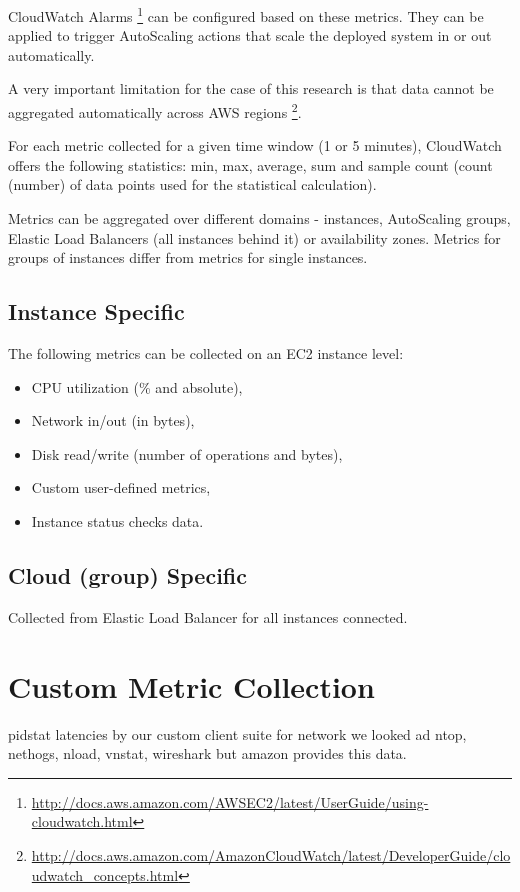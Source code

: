 \documentclass{uvamscse}
\begin{document}
CloudWatch Alarms \footnote{\url{http://docs.aws.amazon.com/AWSEC2/latest/UserGuide/using-cloudwatch.html}} can be configured based on these metrics. They can be applied to trigger AutoScaling actions that scale the deployed system in or out automatically.

A very important limitation for the case of this research is that data cannot be aggregated automatically across AWS regions \footnote{\url{http://docs.aws.amazon.com/AmazonCloudWatch/latest/DeveloperGuide/cloudwatch_concepts.html}}.

For each metric collected for a given time window (1 or 5 minutes), CloudWatch offers the following statistics: min, max, average, sum and sample count (count (number) of data points used for the statistical calculation).

Metrics can be aggregated over different domains - instances, AutoScaling groups, Elastic Load Balancers (all instances behind it) or availability zones. Metrics for groups of instances differ from metrics for single instances.

\subsection{Instance Specific}
The following metrics can be collected on an EC2 instance level:
\begin{itemize}
  \item CPU utilization (\% and absolute),
  \item Network in/out (in bytes),
  \item Disk read/write (number of operations and bytes),
  \item Custom user-defined metrics,
  \item Instance status checks data.
\end{itemize}

\subsection{Cloud (group) Specific}
Collected from Elastic Load Balancer for all instances connected.

\section{Custom Metric Collection} \label{Custom Metric Collection}
pidstat
latencies by our custom client suite
for network we looked ad ntop, nethogs, nload, vnstat, wireshark but amazon provides this data.
\end{document}
